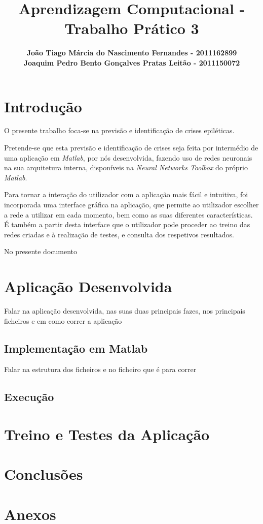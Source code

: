 \documentclass{article}
\title{\bf{Aprendizagem Computacional - Trabalho Prático 3}\vspace{80mm}}
\author{\textbf{João Tiago Márcia do Nascimento Fernandes - 2011162899} \\
\textbf{Joaquim Pedro Bento Gonçalves Pratas Leitão - 2011150072}}
\begin{document}
\maketitle

\pagebreak

\renewcommand*\contentsname{Índice}
\tableofcontents

\pagebreak

\section{Introdução}

O presente trabalho foca-se na previsão e identificação de crises epiléticas.

Pretende-se que esta previsão e identificação de crises seja feita por intermédio de uma aplicação em \emph{Matlab}, por nós desenvolvida, fazendo uso de redes neuronais na sua arquitetura interna, disponíveis na \emph{Neural Networks Toolbox} do próprio \emph{Matlab}.

Para tornar a interação do utilizador com a aplicação mais fácil e intuitiva, foi incorporada uma interface gráfica na aplicação, que permite ao utilizador escolher a rede a utilizar em cada momento, bem como as suas diferentes características. É também a partir desta interface que o utilizador pode proceder ao treino das redes criadas e à realização de testes, e consulta dos respetivos resultados.

No presente documento


\pagebreak

\section{Aplicação Desenvolvida}

Falar na aplicação desenvolvida, nas suas duas principais fazes, nos principais ficheiros e em como correr a aplicação



\subsection{Implementação em Matlab}

Falar na estrutura dos ficheiros e no ficheiro que é para correr

\subsection{Execução}



\pagebreak

\section{Treino e Testes da Aplicação}



\pagebreak

\section{Conclusões}


\pagebreak

\section{Anexos}
\end{document}
